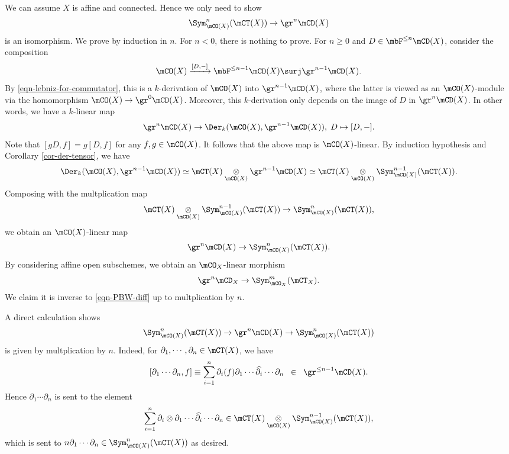 		We can assume $X$ is affine and connected. Hence we only need to show 
		\[
			\Sym^n_{\mCO(X)} (\mCT(X)) \to \gr^n \mCD(X)
		\]
		is an isomorphism. We prove by induction in $n$. For $n< 0$, there is nothing to prove. For $n\ge 0$ and $D\in \mbF^{\le n} \mCD(X)$, consider the composition
		\[
			\mCO(X) \xrightarrow{[D,-]} \mbF^{\le n-1} \mCD(X) \surj \gr^{n-1} \mCD(X).
		\]
		By \eqref{eqn-lebniz-for-commutator}, this is a $k$-derivation of $\mCO(X)$ into $\gr^{n-1} \mCD(X)$, where the latter is viewed as an $\mCO(X)$-module via the homomorphism $\mCO(X) \to \gr^0\mCD(X)$. Moreover, this $k$-derivation only depends on the image of $D$ in $\gr^n \mCD(X)$. In other words, we have a $k$-linear map
		\[
			\gr^n \mCD(X) \to \Der_k( \mCO(X), \gr^{n-1} \mCD(X) ),\; D \mapsto [D,-].
		\]
		Note that $[gD,f]=g[D,f]$ for any $f,g\in \mCO(X)$. It follows that the above map is $\mCO(X)$-linear. By induction hypothesis and Corollary \ref{cor-der-tensor}, we have
		\[
			\Der_k( \mCO(X), \gr^{n-1} \mCD(X) ) \simeq  \mCT(X) \ot_{\mCO(X)}\gr^{n-1} \mCD(X)  \simeq \mCT(X) \ot_{\mCO(X)} \Sym_{\mCO(X)}^{n-1} (\mCT(X)).
		\]
		Composing with the multplication map
		\[
			\mCT(X) \ot_{\mCO(X)} \Sym_{\mCO(X)}^{n-1} (\mCT(X)) \to \Sym_{\mCO(X)}^{n} (\mCT(X)),
		\]
		we obtain an $\mCO(X)$-linear map
		\[
			\gr^n \mCD(X) \to   \Sym_{\mCO(X)}^{n} (\mCT(X)).
		\]
		By considering affine open subschemes, we obtain an $\mCO_X$-linear morphism 
		\[
			\gr^n \mCD_X \to \Sym_{\mCO_X}^m (\mCT_X).
		\]
		We claim it is inverse to \eqref{eqn-PBW-diff} up to multplication by $n$.

		A direct calculation shows 
		\[
			\Sym_{\mCO(X)}^{n} (\mCT(X))\to \gr^n \mCD(X)\to   \Sym_{\mCO(X)}^{n} (\mCT(X))
		\]
		is given by multplication by $n$. Indeed, for $\partial_1,\cdots ,\partial_n\in \mCT(X)$, we have
		\[
			[\partial_1\cdots \partial_n ,f] \equiv \sum_{i=1}^n \partial_i(f) \partial_1\cdots \widehat{\partial_i} \cdots \partial_n  \;\;\in \;\; \gr^{\le n-1} \mCD(X).
		\]
		Hence $\partial_1\cdots \partial_n$ is sent to the element
		\[
			\sum_{i=1}^n \partial_i \otimes \partial_1\cdots \widehat{\partial_i} \cdots \partial_n \in \mCT(X) \ot_{\mCO(X)} \Sym_{\mCO(X)}^{n-1} (\mCT(X)),
		\]
		which is sent to $n \partial_1\cdots \partial_n \in \Sym_{\mCO(X)}^{n} (\mCT(X))$ as desired.

